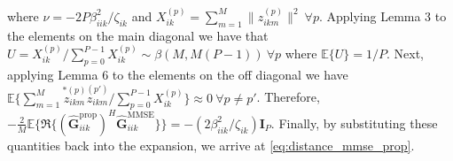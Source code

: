 \documentclass[journal,12pt,onecolumn]{IEEEtran}
\begin{document}
where $\nu = -{2P \beta_{iik}^{2}} / {\zeta_{ik}}$ and $X_{ik}^{(p)} = \sum_{m=1}^{M} \lVert z_{ikm}^{(p)} \rVert^{2} \ \forall p$. Applying Lemma 3 to the elements on the main diagonal we have that $U = X_{ik}^{(p)} / \sum_{p=0}^{P-1}{X_{ik}^{(p)}} \sim \beta(M,M(P-1)) \ \forall p$ where $\mathbb{E}\{ U \} = 1/P$. Next, applying Lemma 6 to the elements on the off diagonal we have $\mathbb{E} \{ \sum_{m=1}^{M}{ \overset{*(p)}{{z}_{ikm}} \overset{(p')}{{z}_{ikm}} } / \sum_{p=0}^{P-1}{X_{ik}^{(p)}} \} \approx 0 \ \forall p \neq p'$. Therefore, $-\frac{2}{M}\mathbb{E} \{\mathfrak{R}\{ (\hat{\textbf{G}}_{iik}^{\text{prop}})^{H} \hat{\textbf{G}}_{iik}^{\text{MMSE}} \}\} = -({2 \beta_{iik}^{2}} / {\zeta_{ik}}) \textbf{I}_{P}$. Finally, by substituting these quantities back into the expansion, we arrive at \eqref{eq:distance_mmse_prop}.
\end{document}
